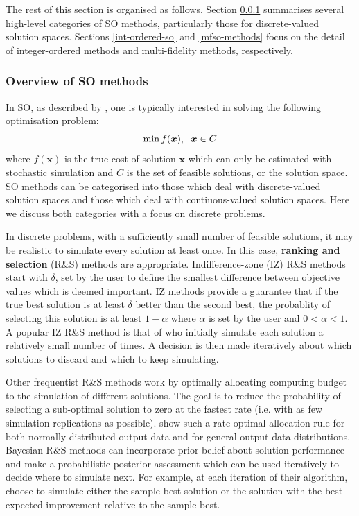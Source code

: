 \documentclass[12pt,a4paper]{article}
\begin{document}
The rest of this section is organised as follows. Section \ref{lit-review-so} summarises several high-level categories of SO methods, particularly those for discrete-valued solution spaces. Sections \ref{int-ordered-so} and \ref{mfso-methods} focus on the detail of integer-ordered methods and multi-fidelity methods, respectively. 

\subsubsection{Overview of SO methods}\label{lit-review-so}

In SO, as described by \cite{nelson2021foundations}, one is typically interested in solving the following optimisation problem: 
%
\begin{equation}\label{SO_general}
    \min f(\boldsymbol{x}), \hspace{0.2cm} \boldsymbol{x} \in C
\end{equation}
%
where $f(\boldsymbol{x})$ is the true cost of solution $\boldsymbol{x}$ which can only be estimated with stochastic simulation and $C$ is the set of feasible solutions, or the solution space. SO methods can be categorised into those which deal with discrete-valued solution spaces and those which deal with contiuous-valued solution spaces. Here we discuss both categories with a focus on discrete problems.

In discrete problems, with a sufficiently small number of feasible solutions, it may be realistic to simulate every solution at least once. In this case, \textbf{ranking and selection} (R\&S) methods are appropriate. Indifference-zone (IZ) R\&S methods start with $\delta$, set by the user to define the smallest difference between objective values which is deemed important. IZ methods provide a guarantee that if the true best solution is at least $\delta$ better than the second best, the probablity of selecting this solution is at least $1-\alpha$ where $\alpha$ is set by the user and $0<\alpha<1$. A popular IZ R\&S method is that of \cite{kim2001fully} who initially simulate each solution a relatively small number of times. A decision is then made iteratively about which solutions to discard and which to keep simulating.

Other frequentist R\&S methods work by optimally allocating computing budget to the simulation of different solutions. The goal is to reduce the probability of selecting a sub-optimal solution to zero at the fastest rate (i.e. with as few simulation replications as possible). \cite{glynn2004large} show such a rate-optimal allocation rule for both normally distributed output data and for general output data distributions. Bayesian R\&S methods can incorporate prior belief about solution performance and make a probabilistic posterior assessment which can be used iteratively to decide where to simulate next. For example, at each iteration of their algorithm, \cite{chen2019complete} choose to simulate either the sample best solution or the solution with the best expected improvement relative to the sample best. 
\end{document}
